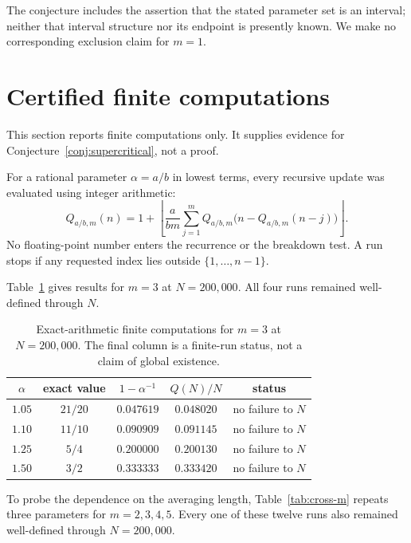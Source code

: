 \documentclass[11pt]{article}
\theoremstyle{definition}
\theoremstyle{remark}
\newcommand{\floor}[1]{\left\lfloor #1\right\rfloor}
\begin{document}
The conjecture includes the assertion that the stated parameter set is an
interval; neither that interval structure nor its endpoint is presently
known.  We make no corresponding exclusion claim for $m=1$.

\section{Certified finite computations}\label{sec:numerics}

This section reports finite computations only.  It supplies evidence for
Conjecture~\ref{conj:supercritical}, not a proof.

For a rational parameter $\alpha=a/b$ in lowest terms, every recursive
update was evaluated using integer arithmetic:
\begin{equation}\label{eq:exact-update}
Q_{a/b,m}(n)
=
1+
\floor{
\frac{a}{bm}\sum_{j=1}^{m}
Q_{a/b,m}\bigl(n-Q_{a/b,m}(n-j)\bigr)
}.
\end{equation}
No floating-point number enters the recurrence or the breakdown test.  A
run stops if any requested index lies outside $\{1,\ldots,n-1\}$.

Table~\ref{tab:slopes} gives results for $m=3$ at $N=200{,}000$.  All four
runs remained well-defined through $N$.

\begin{table}[htbp]
\centering
\caption{Exact-arithmetic finite computations for $m=3$ at
$N=200{,}000$.  The final column is a finite-run status, not a claim of
global existence.}
\label{tab:slopes}
\begin{tabular}{@{}ccccc@{}}
\toprule
$\alpha$ & exact value & $1-\alpha^{-1}$ & $Q(N)/N$ & status \\
\midrule
$1.05$ & $21/20$ & $0.047619$ & $0.048020$ & no failure to $N$ \\
$1.10$ & $11/10$ & $0.090909$ & $0.091145$ & no failure to $N$ \\
$1.25$ & $5/4$   & $0.200000$ & $0.200130$ & no failure to $N$ \\
$1.50$ & $3/2$   & $0.333333$ & $0.333420$ & no failure to $N$ \\
\bottomrule
\end{tabular}
\end{table}

To probe the dependence on the averaging length, Table~\ref{tab:cross-m}
repeats three parameters for $m=2,3,4,5$.  Every one of these twelve runs
also remained well-defined through $N=200{,}000$.
\end{document}
